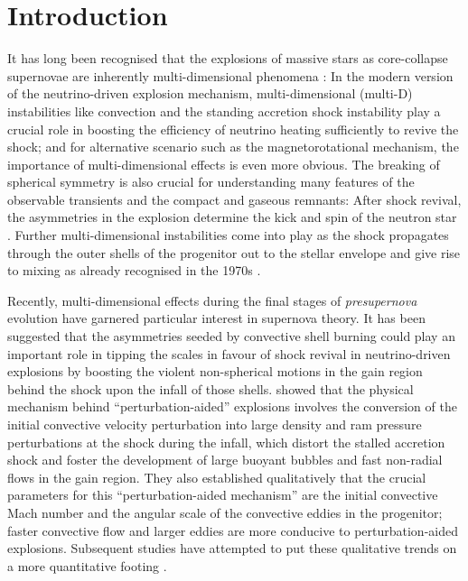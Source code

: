 \documentclass[useAMS,usenatbib]{mnras}
\begin{document}
\section{Introduction}
\label{sec:intro}
It has long been recognised that the explosions of massive stars as core-collapse supernovae are inherently multi-dimensional phenomena \citep[for reviews see][]{janka_12,foglizzo_15}: In the modern version of the neutrino-driven explosion mechanism, multi-dimensional (multi-D) instabilities like convection \citep{herant_94,burrows_95,janka_96} and the standing accretion shock instability \citep{blondin_03,foglizzo_07} play a crucial role in
boosting the efficiency of neutrino heating sufficiently to revive the
shock; and for alternative scenario such as the magnetorotational
mechanism, the importance of multi-dimensional effects is even more
obvious.  The breaking of spherical symmetry is also crucial for
understanding many features of the observable transients and the
compact and gaseous remnants: After shock revival, the asymmetries in
the explosion determine the kick and spin of the neutron star
\citep{janka_94,burrows_96,fryer_04a,scheck_06,wongwathanarat_10b,rantsiou_11}. Further
multi-dimensional instabilities come into play as the shock propagates
through the outer shells of the progenitor out to the stellar envelope
and give rise to mixing as already recognised in 
the 1970s \citep{falk_73,chevalier_76}.

Recently, multi-dimensional effects during the final stages of
\emph{presupernova} evolution have garnered particular interest in
supernova theory. It has been suggested that the asymmetries seeded by
convective shell burning could play an important role in tipping the
scales in favour of shock revival in neutrino-driven explosions
\citep{couch_13,mueller_15a} by boosting the violent non-spherical
motions in the gain region behind the shock upon the infall of those
shells. \citet{mueller_15a} showed that the physical mechanism behind
``perturbation-aided'' explosions involves the conversion of the
initial convective velocity perturbation into large density and ram
pressure perturbations at the shock during the infall, which distort
the stalled accretion shock and foster the development of large
buoyant bubbles and fast non-radial flows in the gain region.  They
also established qualitatively that the crucial parameters for this
``perturbation-aided mechanism'' are the initial convective Mach
number and the angular scale of the convective eddies in the
progenitor; faster convective flow and larger eddies are more
conducive to perturbation-aided explosions. Subsequent studies have
attempted to put these qualitative trends on a more quantitative
footing \citep{mueller_16c,abdikamalov_16}.
\end{document}
